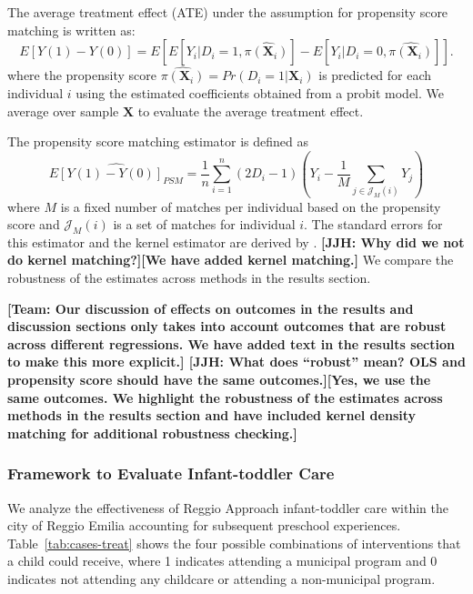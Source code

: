 The average treatment effect (ATE) under the assumption for propensity score matching is written as:
\begin{equation} \label{eq:ATE-PSM}
E[Y(1)-Y(0)] = E[E[Y_i|D_i=1, \hat{\pi(\boldsymbol{X}_i)}] - E[Y_i|D_i=0, \hat{\pi(\boldsymbol{X}_i)}]].
\end{equation}
where the propensity score $\hat{\pi({\boldsymbol{X}_i})} = Pr(D_i=1|\boldsymbol{X}_i)$ is predicted for each individual $i$ using the estimated coefficients obtained from a probit model. We average over sample $\bm{X}$ to evaluate the average treatment effect.

The propensity score matching estimator is defined as
\begin{equation} \label{eq:PSM-estimator}
\widehat{E[Y(1)-Y(0)]_{PSM}} = \frac{1}{n} \sum_{i=1}^{n} (2D_i -1)(Y_i - \frac{1}{M}\sum_{j \in \mathcal{J}_M(i)}Y_j )
\end{equation}
where $M$ is a fixed number of matches per individual based on the propensity score and $\mathcal{J}_M(i)$ is a set of matches for individual $i$. The standard errors for this estimator and the kernel estimator are derived by \cite{Abadie_Imbens_2006_Econometrica}. \textbf{[JJH: Why did we not do kernel matching?][We have added kernel matching.]} We compare the robustness of the estimates across methods in the results section.

\textbf{[Team: Our discussion of effects on outcomes in the results and discussion sections only takes into account outcomes that are robust across different regressions.  We have added text in the results section to make this more explicit.] [JJH: What does ``robust'' mean? OLS and propensity score should have the same outcomes.][Yes, we use the same outcomes. We highlight the robustness of the estimates across methods in the results section and have included kernel density matching for additional robustness checking.]}

\subsubsection{Framework to Evaluate Infant-toddler Care}
\label{subsubsection:itc}

We analyze the effectiveness of Reggio Approach infant-toddler care within the city of Reggio Emilia accounting for subsequent preschool experiences. Table~\ref{tab:cases-treat} shows the four possible combinations of interventions that a child could receive, where 1 indicates attending a municipal program and 0 indicates not attending any childcare or attending a non-municipal program.

